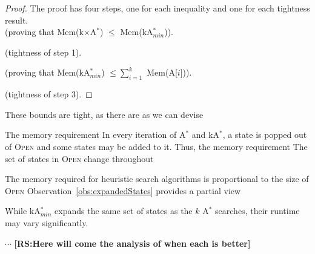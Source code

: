 \documentclass{aicom2e}
\newcommand{\astar}{A$^*$}
\newcommand{\kastar}{kA$^*$}
\newcommand{\kastarmin}{kA$^*_{min}$}
\newcommand{\kastarmax}{kA$^*_{max}$}
\newcommand{\kxastar}{k$\times$A$^*$}
\newcommand{\astari}[1]{A[$#1$]}
\newcommand{\open}{\textsc{Open}}
\newcommand{\roni}[1]{\textbf{[RS:#1]}}
\begin{document}
\begin{proof}
	The proof has four steps, one for each inequality and one for each tightness result.\\
	 (proving that Mem(\kxastar{}) $\leq$ Mem(\kastarmin)).
	
	
	 (tightness of step 1).
	
	
	 (proving that Mem(\kastarmin) $\leq \sum_{i=1}^k$ Mem(\astari{i})).
	
	
	 (tightness of step 3).
	
		
\end{proof}




These bounds are tight, as there are as we can devise  



The memory requirement 
In every iteration of \astar{} and \kastar{}, a state is popped out of \open{} and some states may be added to it. 
Thus, the memory requirement The set of states in \open{} change throughout

The memory required for heuristic search algorithms is proportional to the size of \open{} 
Observation~\ref{obs:expandedStates} provides a partial view










While \kastarmin{} expands the same set of states as the $k$ \astar{} searches, 
their runtime may vary significantly. 

$\cdots$
\roni{Here will come the analysis of when each is better}
\end{document}
